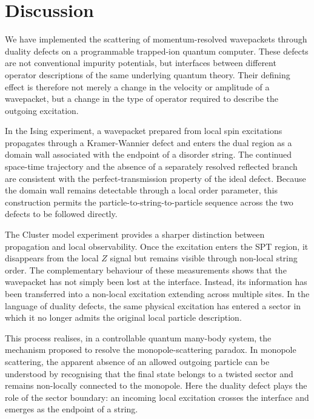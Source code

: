 \documentclass[aps,floatfix,10pt,amssymb,amsfont,amsmath,superscriptaddress,float,nofootinbib,longbibliography,nobalancelastpage,twocolumn]{revtex4-2}
\begin{document}
\section{Discussion}

We have implemented the scattering of momentum-resolved wavepackets through duality defects on a programmable trapped-ion quantum computer. These defects are not conventional impurity potentials, but interfaces between different operator descriptions of the same underlying quantum theory. Their defining effect is therefore not merely a change in the velocity or amplitude of a wavepacket, but a change in the type of operator required to describe the outgoing excitation.

In the Ising experiment, a wavepacket prepared from local spin excitations propagates through a Kramer-Wannier defect and enters the dual region as a domain wall associated with the endpoint of a disorder string. The continued space-time trajectory and the absence of a separately resolved reflected branch are consistent with the perfect-transmission property of the ideal defect. Because the domain wall remains detectable through a local order parameter, this construction permits the particle-to-string-to-particle sequence across the two defects to be followed directly.

The Cluster model experiment provides a sharper distinction between propagation and local observability. Once the excitation enters the SPT region, it disappears from the local $Z$ signal but remains visible through non-local string order. The complementary behaviour of these measurements shows that the wavepacket has not simply been lost at the interface. Instead, its information has been transferred into a non-local excitation extending across multiple sites. In the language of duality defects, the same physical excitation has entered a sector in which it no longer admits the original local particle description.

This process realises, in a controllable quantum many-body system, the mechanism proposed to resolve the monopole-scattering paradox. In monopole scattering, the apparent absence of an allowed outgoing particle can be understood by recognising that the final state belongs to a twisted sector and remains non-locally connected to the monopole. Here the duality defect plays the role of the sector boundary: an incoming local excitation crosses the interface and emerges as the endpoint of a string. 

\end{document}
